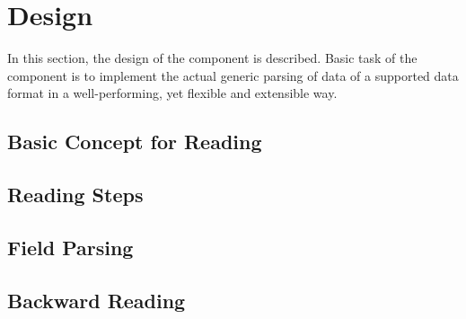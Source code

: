 
\section{\COMPdataPartManagement{} Design}
\label{sec:COMPdataBlockManagementDesign}

In this section, the design of the component \COMPdataPartManagement{} is described. Basic task of the component is to implement the actual generic parsing of data of a supported data format in a well-performing, yet flexible and extensible way.
\subsection{Basic Concept for Reading}%
\label{sec:BasicConceptforReading}%




\subsection{Reading Steps}%
\label{sec:ReadingSteps}%





\subsection{Field Parsing}%
\label{sec:FieldParsing}%


\subsection{Backward Reading}%
\label{sec:BackwardReading}%


